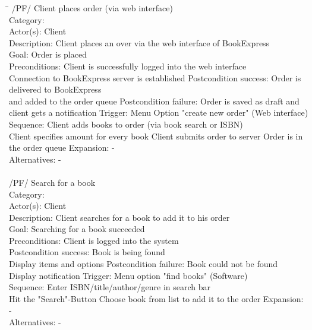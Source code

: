\documentclass[11pt,a4paper,oneside,svgnames]{report}
\begin{document}
\begin{tabbing}
\hspace{3cm}\=\kill
/PF/ \> Client places order (via web interface)\\ 
	 Category: \> \\
	 Actor(s): \> Client\\ 
	 Description: \> Client places an over via the web interface of BookExpress\\ 
	 Goal: \> Order is placed\\
	 Preconditions: \> Client is successfully logged into the web interface\\
	 \> Connection to BookExpress server is established
	 Postcondition success: \> Order is delivered to BookExpress\\
	 \> and added to the order queue
	 Postcondition failure: \> Order is saved as draft and\\
	 \> client gets a notification
	 Trigger: \> Menu Option "create new order" (Web interface)\\
	 Sequence: \> Client adds books to order (via book search or ISBN)\\
	 \> Client specifies amount for every book
	 \> Client submits order to server
	 \> Order is in the order queue
	 Expansion: \> -\\
	 Alternatives: \> -\\
	 \\
	 /PF/ \> Search for a book\\ 
	 Category: \> \\
	 Actor(s): \> Client\\ 
	 Description: \> Client searches for a book to add it to his order\\ 
	 Goal: \> Searching for a book succeeded\\
	 Preconditions: \> Client is logged into the system\\
	 Postcondition success: \> Book is being found\\
	 \> Display items and options
	 Postcondition failure: \> Book could not be found\\
	 \> Display notification
	 Trigger: \> Menu option "find books" (Software)\\
	 Sequence: \> Enter ISBN/title/author/genre in search bar\\
	 \> Hit the "Search"-Button
	 \> Choose book from list to add it to the order
	 Expansion: \> -\\
	 Alternatives: \> -\\
	 \\
\end{tabbing} 
\clearpage
\end{document}
